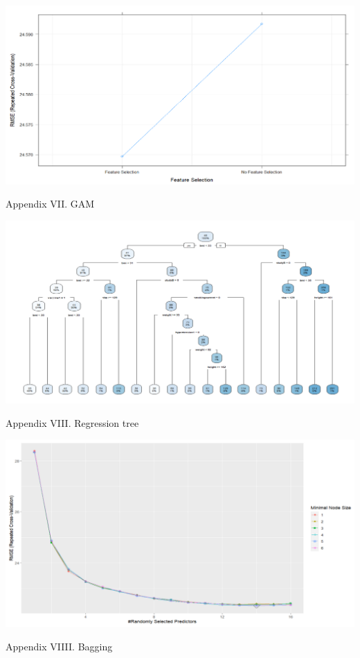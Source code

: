 \documentclass[
]{article}
\begin{document}
\begin{center}\includegraphics[width=0.9\linewidth,height=0.7\textheight]{primary_analysis_plot/gam_plot} \end{center}
\begin{center}
Appendix VII. GAM
\end{center}

\begin{center}\includegraphics[width=0.9\linewidth,height=0.7\textheight]{primary_analysis_plot/tree_plot_2} \end{center}
\begin{center}
Appendix VIII. Regression tree
\end{center}

\begin{center}\includegraphics[width=0.9\linewidth,height=0.7\textheight]{primary_analysis_plot/rf_plot} \end{center}
\begin{center}
Appendix VIIII. Bagging
\end{center}
\end{document}
